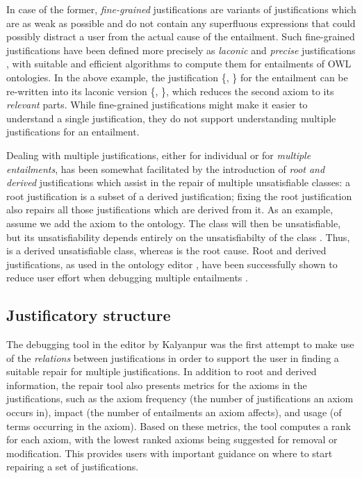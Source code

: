In case of the former, \emph{fine-grained} justifications \cite{lam06tk,kalyanpur06fj,horridge08yi} are variants of justifications which are as weak as possible and do not contain any superfluous expressions that could possibly distract a user from the actual cause of the entailment. Such fine-grained justifications have been defined more precisely as \emph{laconic} and \emph{precise} justifications \cite{horridge08yi}, with suitable and efficient algorithms to compute them for entailments of OWL ontologies. In the above example, the justification \{, \!\!\} for the entailment  can be re-written into its laconic version \{, \!\!\}, which reduces the second axiom to its \emph{relevant} parts. While fine-grained justifications might make it easier to understand a single justification, they do not support understanding multiple justifications for an entailment.

Dealing with multiple justifications, either for individual or for \emph{multiple entailments}, has been somewhat facilitated by the introduction of \emph{root and derived} justifications \cite{parsia05dg} which assist in the repair of multiple unsatisfiable classes: a root justification is a subset of a derived justification; fixing the root justification also repairs all those justifications which are derived from it. As an example, assume we add the axiom  to the ontology. The class  will then be unsatisfiable, but its unsatisfiability depends entirely on the unsatisfiabilty of the class . Thus,  is a derived unsatisfiable class, whereas  is the root cause. Root and derived justifications, as used in the ontology editor \swoop, have been successfully shown to reduce user effort when debugging multiple entailments \cite{kalyanpur05mi}. 

\subsection{Justificatory structure}

The debugging tool in the \swoop editor by Kalyanpur was the first attempt to make use of the \emph{relations} between justifications in order to support the user in finding a suitable repair for multiple justifications. In addition to root and derived information, the repair tool also presents metrics for the axioms in the justifications, such as the axiom frequency (the number of justifications an axiom occurs in), impact (the number of entailments an axiom affects), and usage (of terms occurring in the axiom). Based on these metrics, the tool computes a rank for each axiom, with the lowest ranked axioms being suggested for removal or modification. This provides users with important guidance on where to start repairing a set of justifications.

